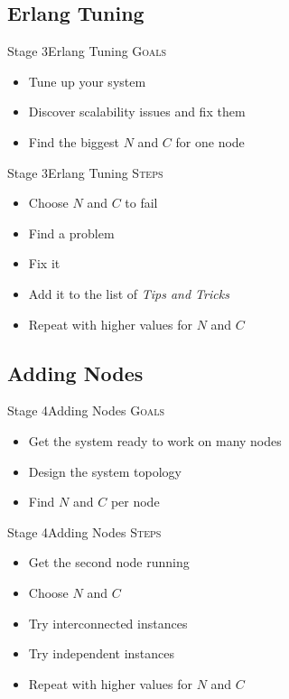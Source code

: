 \documentclass[utf8]{beamer}
\begin{document}
\subsection{Erlang Tuning}
\begin{frame}{Stage 3}{Erlang Tuning}
	\textsc{Goals}
	\begin{itemize}
		\item Tune up \alert{your} system
		\item Discover scalability issues and fix them
		\item Find the biggest $N$ and $C$ for \alert{one node}
	\end{itemize}
\end{frame}
\begin{frame}{Stage 3}{Erlang Tuning}
	\textsc{Steps}
	\begin{itemize}
		\item Choose $N$ and $C$ to fail
		\item Find a problem
		\item Fix it
		\item Add it to the list of \emph{Tips and Tricks}
		\pause
		\item Repeat with higher values for $N$ and $C$
	\end{itemize}
\end{frame}

\subsection{Adding Nodes}
\begin{frame}{Stage 4}{Adding Nodes}
	\textsc{Goals}
	\begin{itemize}
		\item Get the system ready to work on many nodes
		\item Design the system topology
		\item Find $N$ and $C$ \alert{per node}
	\end{itemize}
\end{frame}
\begin{frame}{Stage 4}{Adding Nodes}
	\textsc{Steps}
	\begin{itemize}
		\item Get the second node running
		\item Choose $N$ and $C$
		\item Try interconnected instances
		\item Try independent instances
		\pause
		\item Repeat with higher values for $N$ and $C$
	\end{itemize}
\end{frame}
\end{document}
